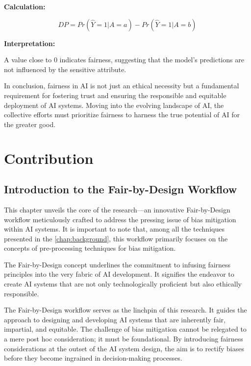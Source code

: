 \documentclass[12pt,a4paper,openright,twoside]{book}
\begin{document}
\textbf{Calculation:}

\[ DP = Pr(\hat{Y} = 1|A = a) - Pr(\hat{Y} = 1|A = b) \]

\textbf{Interpretation:}

A value close to 0 indicates fairness, suggesting that the model's predictions are not influenced by the sensitive attribute.


In conclusion, fairness in AI is not just an ethical necessity but a fundamental requirement for fostering trust and ensuring the responsible and equitable deployment of AI systems. Moving into the evolving landscape of AI, the collective efforts must prioritize fairness to harness the true potential of AI for the greater good.

%

\chapter{Contribution} %
\label{chap:contribution}

\section{Introduction to the Fair-by-Design Workflow}

This chapter unveils the core of the research—an innovative Fair-by-Design workflow meticulously crafted to address the pressing issue of bias mitigation within AI systems. It is important to note that, among all the techniques presented in the \cref{chap:background}, this workflow primarily focuses on the concepts of pre-processing techniques for bias mitigation. 

The Fair-by-Design concept underlines the commitment to infusing fairness principles into the very fabric of AI development. It signifies the endeavor to create AI systems that are not only technologically proficient but also ethically responsible. 

The Fair-by-Design workflow serves as the linchpin of this research. It guides the approach to designing and developing AI systems that are inherently fair, impartial, and equitable. The challenge of bias mitigation cannot be relegated to a mere post hoc consideration; it must be foundational. By introducing fairness considerations at the outset of the AI system design, the aim is to rectify biases before they become ingrained in decision-making processes. 
\end{document}
